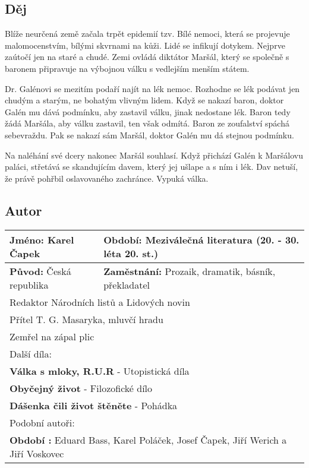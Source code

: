 \subsection*{Děj}
Blíže neurčená země začala trpět epidemií tzv. Bílé nemoci, která se projevuje malomocenstvím, bílými skvrnami na kůži.
Lidé se infikují dotykem.
Nejprve zaútočí jen na staré a chudé.
Zemi ovládá diktátor Maršál, který se společně s baronem připravuje na výbojnou válku s vedlejším menším státem.

Dr. Galénovi se mezitím podaří najít na lék nemoc.
Rozhodne se lék podávat jen chudým a starým, ne bohatým vlivným lidem.
Když se nakazí baron, doktor Galén mu dává podmínku, aby zastavil válku, jinak nedostane lék.
Baron tedy žádá Maršála, aby válku zastavil, ten však odmítá.
Baron ze zoufalství spáchá sebevraždu.
Pak se nakazí sám Maršál, doktor Galén mu dá stejnou podmínku.

Na naléhání své dcery nakonec Maršál souhlasí.
Když přichází Galén k Maršálovu paláci, střetává se skandujícím davem, který jej ušlape a s ním i lék.
Dav netuší, že právě pohřbil oslavovaného zachránce.
Vypuká válka.
\subsection*{Autor}
\begin{tabularx}{\linewidth}{l|l}
  \textbf{Jméno:} Karel Čapek     & \textbf{Období:} Meziválečná literatura (20. - 30. léta 20. st.)         \\
  \hline
  \textbf{Původ:} Česká republika & \textbf{Zaměstnání:} Prozaik, dramatik, básník, překladatel              \\
  \hline
  \multicolumn{2}{l}{Redaktor Národních listů a Lidových novin}                                              \\
  \multicolumn{2}{l}{Přítel T. G. Masaryka, mluvčí hradu}                                                    \\
  \multicolumn{2}{l}{Zemřel na zápal plic}                                                                   \\
  \hline
  \multicolumn{2}{l}{Další díla:}                                                                            \\
  \multicolumn{2}{l}{\textbf{Válka s mloky, R.U.R} - Utopistická díla}                                       \\
  \multicolumn{2}{l}{\textbf{Obyčejný život} - Filozofické dílo}                                             \\
  \multicolumn{2}{l}{\textbf{Dášenka čili život štěněte} - Pohádka}                                          \\
  \hline
  \multicolumn{2}{l}{Podobní autoři:}                                                                        \\
  \multicolumn{2}{l}{\textbf{Období :} Eduard Bass, Karel Poláček, Josef Čapek, Jiří Werich a Jiří Voskovec} \\
\end{tabularx}
